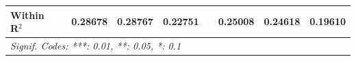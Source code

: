 \begin{table}[htbp]
\begin{tabular}{lcccccccc}
      Within R$^2$              &                        & 0.28678                 & 0.28767                 & 0.22751                 &                         & 0.25008                 & 0.24618                 & 0.19610\\  
      \midrule \midrule
      \multicolumn{9}{l}{\emph{Signif. Codes: ***: 0.01, **: 0.05, *: 0.1}}\\
   \end{tabular}
\end{table}


